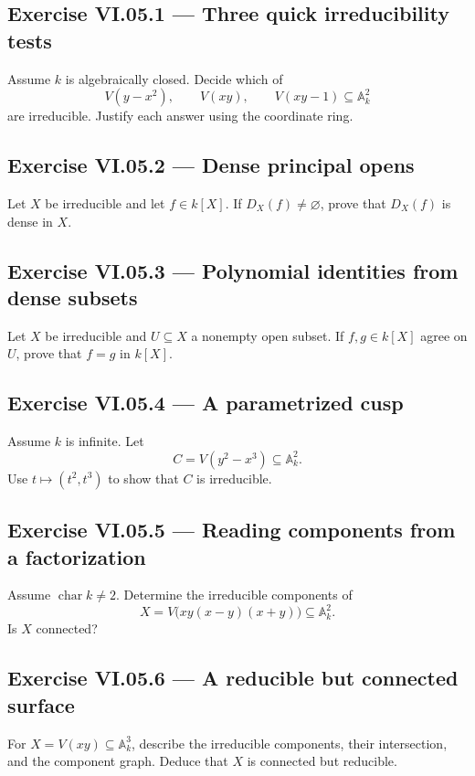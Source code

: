 
\subsection*{Exercise VI.05.1 --- Three quick irreducibility tests}
\label{ex:vi05-1}
Assume \(k\) is algebraically closed.  Decide which of
\[
V(y-x^2),\qquad V(xy),\qquad V(xy-1)\subseteq\mathbb A_k^2
\]
are irreducible.  Justify each answer using the coordinate ring.

\subsection*{Exercise VI.05.2 --- Dense principal opens}
\label{ex:vi05-2}
Let \(X\) be irreducible and let \(f\in k[X]\).  If \(D_X(f)\neq\varnothing\), prove
that \(D_X(f)\) is dense in \(X\).

\subsection*{Exercise VI.05.3 --- Polynomial identities from dense subsets}
\label{ex:vi05-3}
Let \(X\) be irreducible and \(U\subseteq X\) a nonempty open subset.  If
\(f,g\in k[X]\) agree on \(U\), prove that \(f=g\) in \(k[X]\).

\subsection*{Exercise VI.05.4 --- A parametrized cusp}
\label{ex:vi05-4}
Assume \(k\) is infinite.  Let
\[
C=V(y^2-x^3)\subseteq\mathbb A_k^2.
\]
Use \(t\mapsto(t^2,t^3)\) to show that \(C\) is irreducible.

\subsection*{Exercise VI.05.5 --- Reading components from a factorization}
\label{ex:vi05-5}
Assume \(\operatorname{char}k\neq2\).  Determine the irreducible components of
\[
X=V\bigl(xy(x-y)(x+y)\bigr)\subseteq\mathbb A_k^2.
\]
Is \(X\) connected?

\subsection*{Exercise VI.05.6 --- A reducible but connected surface}
\label{ex:vi05-6}
For \(X=V(xy)\subseteq\mathbb A_k^3\), describe the irreducible components, their
intersection, and the component graph.  Deduce that \(X\) is connected but reducible.

